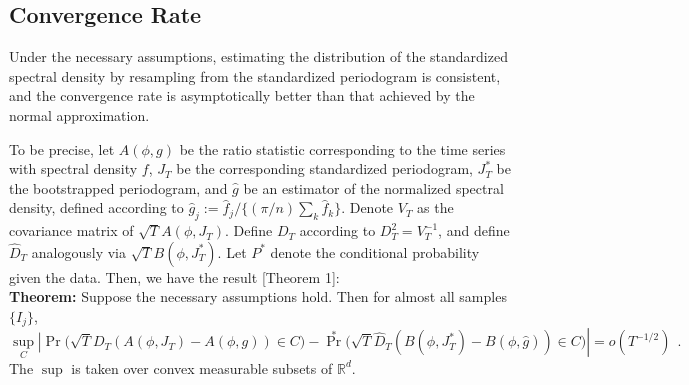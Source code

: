 \subsection*{Convergence Rate}

Under the necessary assumptions, estimating the distribution of the standardized spectral density by resampling from the standardized periodogram is consistent, and the convergence rate is asymptotically better than that achieved by the normal approximation. 

To be precise, let $A(\phi,g)$ be the ratio statistic corresponding to the time series with spectral density $f$, $J_T$ be the corresponding standardized periodogram, $J_T^*$ be the bootstrapped periodogram, and $\hat g$ be an estimator of the normalized spectral density, defined according to $\hat g_j := \hat f_j / \{(\pi/n) \sum_k \hat f_k\}$. Denote $V_T$ as the covariance matrix of $\sqrt T A(\phi,J_T)$. Define $D_T$ according to $D_T^2 = V_T^{-1}$, and define $\hat D_T$ analogously via $\sqrt T B(\phi,J_T^*)$. Let $P^*$ denote the conditional probability given the data. Then, we have the result \cite{bootstrap}[Theorem 1]:\\

\textbf{Theorem:}
Suppose the necessary assumptions hold. Then for almost all samples $\{I_j\}$, 
$$
\sup_C \left| \Pr\bigl( \sqrt T D_T(A(\phi,J_T) - A(\phi,g)) \in C \bigr) \right. - \left. \Pr^*\bigl(\sqrt T \hat D_T(B(\phi,J_T^*)-B(\phi,\hat g)) \in C  \bigr)\right| = o(T^{-1/2})~~.
$$
The $\sup$ is taken over convex measurable subsets of $\mathbb R^d$.
